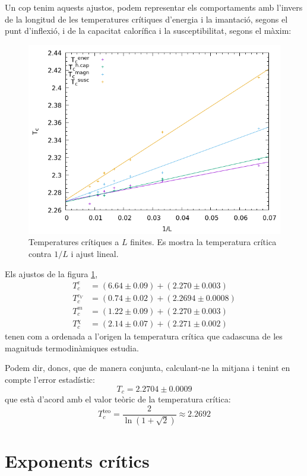 \documentclass[a4paper]{article}
\begin{document}
Un cop tenim aquests ajustos, podem representar els comportaments amb l'invers de la longitud de les temperatures crítiques d'energia i la imantació, segons el punt d'inflexió, i de la capacitat calorífica i la susceptibilitat, segons el màxim:

\begin{figure}[H]
    \centering
    \includegraphics[width=.6\textwidth]{coefs-tc.png}
    \caption{Temperatures crítiques a $L$ finites. Es mostra la temperatura crítica contra $1/L$ i ajust lineal.}
    \label{fig:tc}
\end{figure}

Els ajustos de la figura \ref{fig:tc},
\begin{align*}
    T_c^{e} &= (6.64 \pm 0.09) + (2.270 \pm 0.003) \\
    T_c^{c_V} &= (0.74 \pm 0.02) + (2.2694 \pm 0.0008) \\
    T_c^{m} &= (1.22 \pm 0.09) + (2.270 \pm 0.003) \\
    T_c^{\chi} &= (2.14 \pm 0.07) + (2.271 \pm 0.002)
\end{align*}
tenen com a ordenada a l'origen la temperatura crítica que cadascuna de les magnituds termodinàmiques estudia.

Podem dir, doncs, que de manera conjunta, calculant-ne la mitjana i tenint en compte l'error estadístic:
\begin{equation}
    T_c = 2.2704 \pm 0.0009
\end{equation}
que està d'acord amb el valor teòric de la temperatura crítica:
\begin{equation}
    T_c^\text{teo} = \frac{2}{\ln(1+\sqrt{2})} \approx 2.2692
\end{equation}


\section{Exponents crítics}
\end{document}
